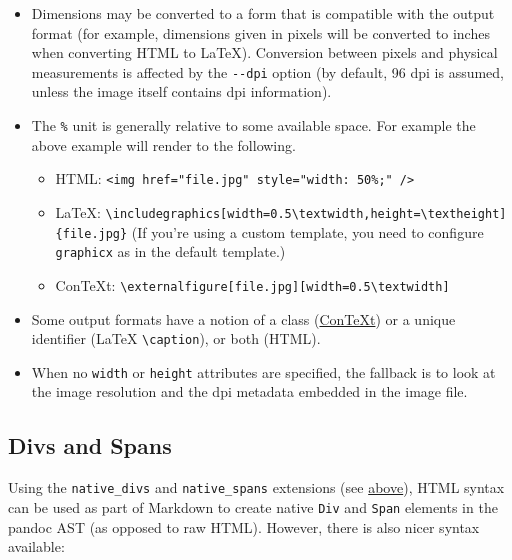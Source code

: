 \documentclass[
]{article}
\providecommand{\tightlist}{%
  \setlength{\itemsep}{0pt}\setlength{\parskip}{0pt}}
\begin{document}
\begin{itemize}
\tightlist
\item
  Dimensions may be converted to a form that is compatible with the
  output format (for example, dimensions given in pixels will be
  converted to inches when converting HTML to LaTeX). Conversion between
  pixels and physical measurements is affected by the \texttt{-\/-dpi}
  option (by default, 96 dpi is assumed, unless the image itself
  contains dpi information).
\item
  The \texttt{\%} unit is generally relative to some available space.
  For example the above example will render to the following.

  \begin{itemize}
  \tightlist
  \item
    HTML:
    \texttt{\textless{}img\ href="file.jpg"\ style="width:\ 50\%;"\ /\textgreater{}}
  \item
    LaTeX:
    \texttt{\textbackslash{}includegraphics{[}width=0.5\textbackslash{}textwidth,height=\textbackslash{}textheight{]}\{file.jpg\}}
    (If you're using a custom template, you need to configure
    \texttt{graphicx} as in the default template.)
  \item
    ConTeXt:
    \texttt{\textbackslash{}externalfigure{[}file.jpg{]}{[}width=0.5\textbackslash{}textwidth{]}}
  \end{itemize}
\item
  Some output formats have a notion of a class
  (\href{https://wiki.contextgarden.net/Using_Graphics\#Multiple_Image_Settings}{ConTeXt})
  or a unique identifier (LaTeX \texttt{\textbackslash{}caption}), or
  both (HTML).
\item
  When no \texttt{width} or \texttt{height} attributes are specified,
  the fallback is to look at the image resolution and the dpi metadata
  embedded in the image file.
\end{itemize}

\hypertarget{divs-and-spans}{%
\subsection{Divs and Spans}\label{divs-and-spans}}

Using the \texttt{native\_divs} and \texttt{native\_spans} extensions
(see \protect\hyperlink{extension-native_divs}{above}), HTML syntax can
be used as part of Markdown to create native \texttt{Div} and
\texttt{Span} elements in the pandoc AST (as opposed to raw HTML).
However, there is also nicer syntax available:
\end{document}
